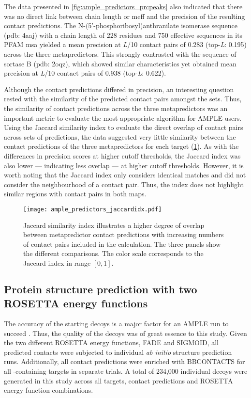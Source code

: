 The data presented in \cref{fig:ample_predictors_prcpeaks} also indicated that there was no direct link between chain length or \gls{meff} and the precision of the resulting contact predictions. The N-(5'-phosphoribosyl)anthranilate isomerase sequence (\gls{pdb}: 4aaj) with a chain length of 228 residues and 750 effective sequences in its PFAM \gls{msa} yielded a mean precision at \textit{L}/10 contact pairs of 0.283 (top-\textit{L}: 0.195) across the three metapredictors. This strongly contrasted with the sequence of sortase B (\gls{pdb}: 2oqz), which showed similar characteristics yet obtained  mean precision at \textit{L}/10 contact pairs of 0.938 (top-\textit{L}: 0.622).

Although the contact predictions differed in precision, an interesting question rested with the similarity of the predicted contact pairs amongst the sets. Thus, the similarity of contact predictions across the three metapredictors was an important metric to evaluate the most appropriate algorithm for AMPLE users. Using the Jaccard similarity index to evaluate the direct overlap of contact pairs across sets of predictions, the data suggested very little similarity between the contact predictions of the three metapredictors for each target (\cref{fig:ample_predictors_jaccardidx}). As with the differences in precision scores at higher cutoff thresholds, the Jaccard index was also lower --- indicating less overlap --- at higher cutoff thresholds. However, it is worth noting that the Jaccard index only considers identical matches and did not consider the neighbourhood of a contact pair. Thus, the index does not highlight similar regions with contact pairs in both maps.

\begin{figure}[H]
    \centering
    \texttt{[image: ample\_predictors\_jaccardidx.pdf]}
    \caption[Metapredictor contact pair similarity analysis]{Jaccard similarity index illustrates a higher degree of overlap between metapredictor contact predictions with increasing numbers of contact pairs included in the calculation. The three panels show the different comparisons. The color scale corresponds to the Jaccard index in range $[0, 1]$.}
    \label{fig:ample_predictors_jaccardidx}
\end{figure}

\subsection{Protein structure prediction with two ROSETTA energy functions}
The accuracy of the starting decoys is a major factor for an AMPLE run to succeed \cite{Thomas2017-sh}. Thus, the quality of the decoys was of great essence to this study. Given the two different ROSETTA energy functions, FADE and SIGMOID, all predicted contacts were subjected to individual \textit{ab initio} structure prediction runs. Additionally, all contact predictions were enriched with BBCONTACTS for all \textbeta-containing targets in separate trials. A total of 234,000 individual decoys were generated in this study across all targets, contact predictions and ROSETTA energy function combinations.

